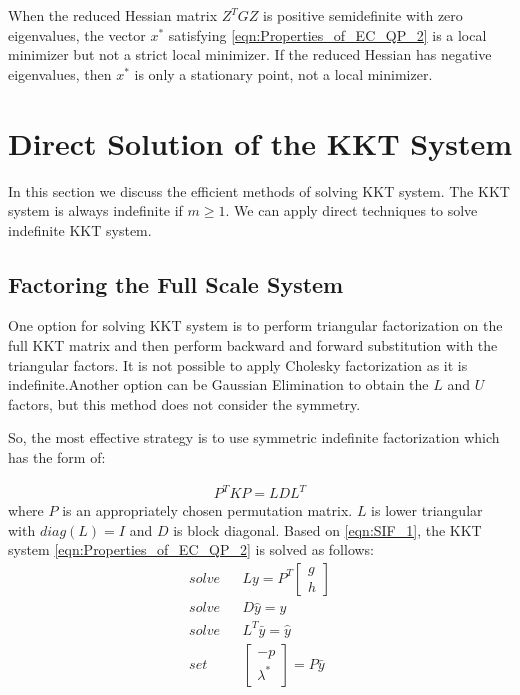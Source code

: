 When the reduced Hessian matrix $Z^TGZ$ is positive semidefinite with zero eigenvalues, the vector $x^*$ satisfying \ref{eqn:Properties_of_EC_QP_2} is a local minimizer but not a strict local minimizer. If the reduced Hessian has negative eigenvalues, then $x^*$ is only a stationary point, not a local minimizer.

\section{Direct Solution of the KKT System}

In this section we discuss the efficient methods of solving KKT system. The KKT system is always indefinite if $m\geqslant1$. We can apply direct techniques to solve indefinite KKT system.

\subsection*{Factoring the Full Scale System}
One option for solving KKT system is to perform triangular factorization on the full KKT matrix and then perform backward and forward substitution with the triangular factors. It is not possible to apply Cholesky factorization as it is indefinite.Another option can be Gaussian Elimination to obtain the $L$ and $U$ factors, but this method does not consider the symmetry.

So, the most effective strategy is to use symmetric indefinite factorization which has the form of:

\begin{equation}
	\begin{aligned}
		P^TKP = LDL^T
	\end{aligned}
	\label{eqn:SIF_1}
\end{equation}
where $P$ is an appropriately chosen permutation matrix. $L$ is lower triangular with $diag(L) = I$ and $D$ is block diagonal.
Based on \ref{eqn:SIF_1}, the KKT system \ref{eqn:Properties_of_EC_QP_2} is solved as follows:
\begin{equation}
	\begin{aligned}
		solve & & Ly = P^T
		\begin{bmatrix}
  		g \\
    	h
    \end{bmatrix}\\
    solve & & D\hat{y} = y\\
    solve & & L^T\bar{y} = \hat{y}\\
    set & & \begin{bmatrix}
  		-p \\
    	\lambda^*
    \end{bmatrix} = P\bar{y}
	\end{aligned}
	\label{eqn:SIF_2}
\end{equation}

